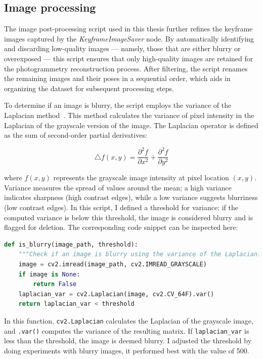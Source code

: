 \subsection{Image processing}

The image post-processing script used in this thesis further refines the keyframe images captured by the \textit{KeyframeImageSaver} node. By automatically identifying and discarding low-quality images — namely, those that are either blurry or overexposed — this script ensures that only high-quality images are retained for the photogrammetry reconstruction process. After filtering, the script renames the remaining images and their poses in a sequential order, which aids in organizing the dataset for subsequent processing steps.

To determine if an image is blurry, the script employs the variance of the Laplacian method~\cite{blur_detection}. This method calculates the variance of pixel intensity in the Laplacian of the grayscale version of the image. The Laplacian operator is defined as the sum of second-order partial derivatives:

\begin{equation}
 \triangle \mathit{f}\left (x,y  \right )= \frac{\partial^2 f }{\partial x^2} + \frac{\partial^2 f }{\partial y^2}
\end{equation}

where \(f(x,y)\) represents the grayscale image intensity at pixel location \((x,y)\). Variance measures the spread of values around the mean; a high variance indicates sharpness (high contrast edges), while a low variance suggests blurriness (low contrast edges). In this script, I defined a threshold for variance: if the computed variance is below this threshold, the image is considered blurry and is flagged for deletion. 
The corresponding code snippet can be inspected here:

\FloatBarrier
\begin{lstlisting}[language=python,frame=single,float=!ht]
def is_blurry(image_path, threshold):
    """Check if an image is blurry using the variance of the Laplacian."""
    image = cv2.imread(image_path, cv2.IMREAD_GRAYSCALE)
    if image is None:
        return False
    laplacian_var = cv2.Laplacian(image, cv2.CV_64F).var()
    return laplacian_var < threshold
\end{lstlisting}
\FloatBarrier

In this function, \verb|cv2.Laplacian| calculates the Laplacian of the grayscale image, and \verb|.var()| computes the variance of the resulting matrix. If \verb|laplacian_var| is less than the threshold, the image is deemed blurry. I adjusted the threshold by doing experiments with blurry images, it performed best with the value of 500.

